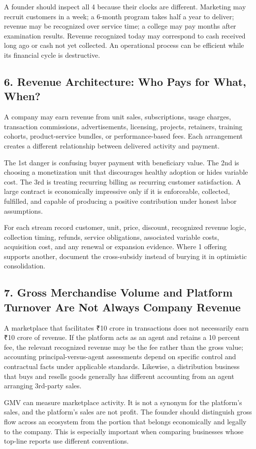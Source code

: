A founder should inspect all 4 because their clocks are different. Marketing may recruit customers in a week; a 6-month program takes half a year to deliver; revenue may be recognized over service time; a college may pay months after examination results. Revenue recognized today may correspond to cash received long ago or cash not yet collected. An operational process can be efficient while its financial cycle is destructive.

\subsection*{6. Revenue Architecture: Who Pays for What, When?}

A company may earn revenue from unit sales, subscriptions, usage charges, transaction commissions, advertisements, licensing, projects, retainers, training cohorts, product-service bundles, or performance-based fees. Each arrangement creates a different relationship between delivered activity and payment.

The 1st danger is confusing buyer payment with beneficiary value. The 2nd is choosing a monetization unit that discourages healthy adoption or hides variable cost. The 3rd is treating recurring billing as recurring customer satisfaction. A large contract is economically impressive only if it is enforceable, collected, fulfilled, and capable of producing a positive contribution under honest labor assumptions.

For each stream record customer, unit, price, discount, recognized revenue logic, collection timing, refunds, service obligations, associated variable costs, acquisition cost, and any renewal or expansion evidence. Where 1 offering supports another, document the cross-subsidy instead of burying it in optimistic consolidation.

\subsection*{7. Gross Merchandise Volume and Platform Turnover Are Not Always Company Revenue}

A marketplace that facilitates ₹10 crore in transactions does not necessarily earn ₹10 crore of revenue. If the platform acts as an agent and retains a 10 percent fee, the relevant recognized revenue may be the fee rather than the gross value; accounting principal-versus-agent assessments depend on specific control and contractual facts under applicable standards. Likewise, a distribution business that buys and resells goods generally has different accounting from an agent arranging 3rd-party sales.

GMV can measure marketplace activity. It is not a synonym for the platform's sales, and the platform's sales are not profit. The founder should distinguish gross flow across an ecosystem from the portion that belongs economically and legally to the company. This is especially important when comparing businesses whose top-line reports use different conventions.
